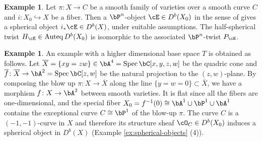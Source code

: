 \documentclass[12pt]{amsart}
\numberwithin{equation}{section}
\theoremstyle{plain}
\theoremstyle{definition}
\newtheorem{example}[theorem]{Example}
\DeclareMathOperator{\Auteq}{\mathrm{Auteq}}
\DeclareMathOperator{\Spec}{\mathrm{Spec}}
\begin{document}
\begin{example}
    Let $\pi \colon X \to C$ be a smooth family of varieties over a smooth curve $C$ and $i \colon X_0 \hookrightarrow X$ be a fiber.
    Then a $\bP^n$-object $\cE \in D^b(X_0)$ in the sense of \cite{MR2200048} gives a spherical object $i_*{\cE} \in D^b(X)$, under suitable assumptions.
    The half-spherical twist $H_{\cE} \in \Auteq{D^b(X_0)}$ is isomorphic to the associated $\bP^n$-twist $P_{\cE}$.
\end{example}


\begin{example}\label{example_from_Atiyah_flop}
    An example with a higher dimensional base space $T$ is obtained as follows.
    Let $\overline{X} = \{xy=zw\} \in \bA^4 = \Spec \bC[x, y, z, w]$ be the quadric cone and $\overline{f} \colon \overline{X} \to \bA^2 = \Spec \bC[z, w]$ be the natural projection to the $(z, w)$-plane.
    By composing the blow up $\pi \colon X \to \overline{X}$ along the line $\{y=w=0\} \subset \bar{X}$, we have a morphism $f \colon X \to \bA^2$ between smooth varieties.
    It is flat since all the fibers are one-dimensional,
    and the special fiber $X_0=f^{-1}(0) \cong \bA^1 \cup \bP^1 \cup \bA^1$ contains
    the exceptional curve $C \cong \bP^1$ of the blow-up $\pi$.
    The curve $C$ is a $(-1, -1)$-curve in $X$ and therefore its structure sheaf $\cO_C \in D^b(X_0)$ induces a spherical object in $D^b(X)$ (Example \ref{ex:spherical-objects} (4)).
\end{example}
\end{document}
